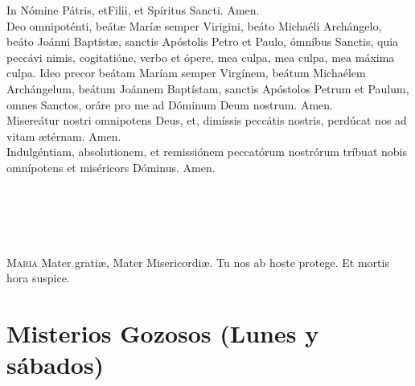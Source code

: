 \documentclass[10pt,a4paper,oneside]{book}
\newcounter{joyful-counter}
\begin{document}
\begin{minipage}[t]{0.475\textwidth}
      In Nómine Pátris, et{\redcross}Filii, et Spíritus Sancti. Amen.\\

       Deo omnipoténti, beát{\ae} Marí{\ae} semper Virigini, beáto Michaéli Archángelo, beáto Joánni Baptíst{\ae}, 
      sanctis Apóstolis Petro et Paulo, ómníbus Sanctis, quia peccávi nimis, cogitatióne, verbo et ópere, mea culpa, mea culpa, 
      mea máxima culpa. Ideo precor beátam     Maríam semper Virgínem, beátum Michaélem Archángelum, beátum Joánnem Baptístam, 
      sanctis Apóstolos Petrum et Paulum, omnes Sanctos, oráre pro me ad Dóminum Deum nostrum. Amen.\\
      Misereátur nostri omnipotens Deus, et, dimíssis peccátis nostris, perdúcat nos ad vitam {\ae}térnam. Amen.\\
      Indulgéntiam, absolutionem, et remissiónem peccatórum nostrórum tríbuat nobis omnípotens et miséricors Dóminus. Amen.\\

      \\
      \\\\
      \\\\
      \textsc{Maria} Mater grati{\ae}, Mater Misericordi{\ae}. Tu nos ab hoste protege. Et mortis hora suspice.
\end{minipage}

\medskip

\begin{center}
\end{center}

\section*{Misterios Gozosos (Lunes y sábados)}

\end{document}

